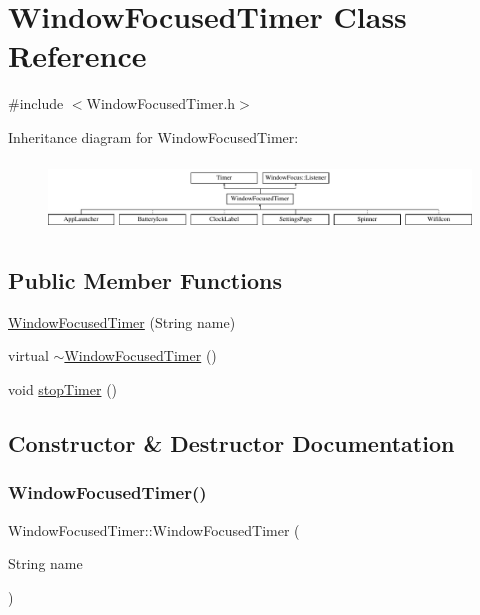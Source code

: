 \hypertarget{classWindowFocusedTimer}{}\section{Window\+Focused\+Timer Class Reference}
\label{classWindowFocusedTimer}


{\ttfamily \#include $<$Window\+Focused\+Timer.\+h$>$}

Inheritance diagram for Window\+Focused\+Timer\+:\begin{figure}[H]
\begin{center}
\leavevmode
\includegraphics[height=1.866667cm]{classWindowFocusedTimer}
\end{center}
\end{figure}
\subsection*{Public Member Functions}
\begin{DoxyCompactItemize}
\item 
\mbox{\hyperlink{classWindowFocusedTimer_ae42888d6e22f510bfb1942705bd93a13}{Window\+Focused\+Timer}} (String name)
\item 
virtual \mbox{\hyperlink{classWindowFocusedTimer_ab6b2e47b76928ee60580e124bbaf0823}{$\sim$\+Window\+Focused\+Timer}} ()
\item 
void \mbox{\hyperlink{classWindowFocusedTimer_adecff2108f614ab410d59a1783ddfa82}{stop\+Timer}} ()
\end{DoxyCompactItemize}


\subsection{Constructor \& Destructor Documentation}
\mbox{\label{classWindowFocusedTimer_ae42888d6e22f510bfb1942705bd93a13}} 
\subsubsection{\texorpdfstring{Window\+Focused\+Timer()}{WindowFocusedTimer()}}
{\footnotesize\ttfamily Window\+Focused\+Timer\+::\+Window\+Focused\+Timer (\begin{DoxyParamCaption}\item[{String}]{name }\end{DoxyParamCaption})\hspace{0.3cm}{\ttfamily [inline]}}


